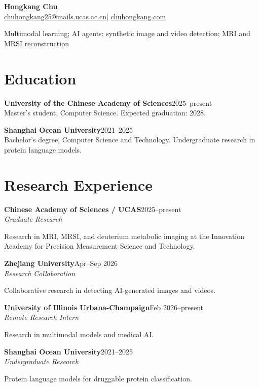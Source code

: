 \documentclass[10pt,letterpaper]{article}
\begin{document}
\begin{center}{\LARGE\bfseries Hongkang Chu}\\[5pt]
\href{mailto:chuhongkang25@mails.ucas.ac.cn}{chuhongkang25@mails.ucas.ac.cn}\quad|\quad
\href{https://chuhongkang.com}{chuhongkang.com}\end{center}

{\small Multimodal learning; AI agents; synthetic image and video detection; MRI and MRSI reconstruction}
\section{Education}
\textbf{University of the Chinese Academy of Sciences}\hfill 2025--present\\
Master's student, Computer Science. Expected graduation: 2028.\par\vspace{5pt}
\textbf{Shanghai Ocean University}\hfill 2021--2025\\
Bachelor's degree, Computer Science and Technology. Undergraduate research in protein language models.\par\vspace{5pt}
\section{Research Experience}
\textbf{Chinese Academy of Sciences / UCAS}\hfill 2025--present\\
\textit{Graduate Research}\par
Research in MRI, MRSI, and deuterium metabolic imaging at the Innovation Academy for Precision Measurement Science and Technology.\par\vspace{6pt}
\textbf{Zhejiang University}\hfill Apr--Sep 2026\\
\textit{Research Collaboration}\par
Collaborative research in detecting AI-generated images and videos.\par\vspace{6pt}
\textbf{University of Illinois Urbana-Champaign}\hfill Feb 2026--present\\
\textit{Remote Research Intern}\par
Research in multimodal models and medical AI.\par\vspace{6pt}
\textbf{Shanghai Ocean University}\hfill 2021--2025\\
\textit{Undergraduate Research}\par
Protein language models for druggable protein classification.\par\vspace{6pt}
\end{document}
